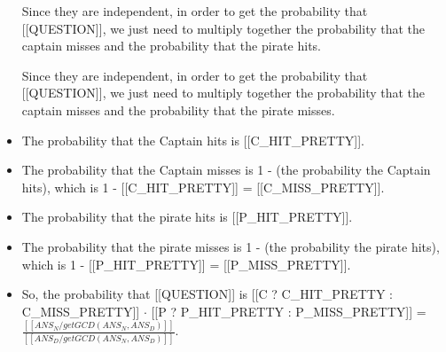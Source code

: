 \documentclass{article}
\begin{document}
\begin{itemize}
                    
                        Since they are independent, in order to get the probability that [[QUESTION]], we just need to multiply together
                    the probability that the captain misses and the probability that
                    the pirate hits.
                    
                        Since they are independent, in order to get the probability that [[QUESTION]], we just need to multiply together
                    the probability that the captain misses and the probability that
                    the pirate misses.
  \item The probability that the Captain hits is [[C\_HIT\_PRETTY]].
  \item The probability that the Captain misses is 1 -  (the probability the Captain
                    hits), which is 1 - [[C\_HIT\_PRETTY]] = [[C\_MISS\_PRETTY]].
  \item The probability that the pirate hits is [[P\_HIT\_PRETTY]].
  \item The probability that the pirate misses is 1 -  (the probability the pirate
                    hits), which is 1 - [[P\_HIT\_PRETTY]] = [[P\_MISS\_PRETTY]].
  \item So, the probability that [[QUESTION]] is
                    [[C ? C\_HIT\_PRETTY : C\_MISS\_PRETTY]] $\cdot$ [[P ? P\_HIT\_PRETTY : P\_MISS\_PRETTY]] =
                    $\frac{[[ANS_N/getGCD(ANS_N,ANS_D)]]}{[[ANS_D/getGCD(ANS_N,ANS_D)]]}$.
\end{itemize}
\end{document}
